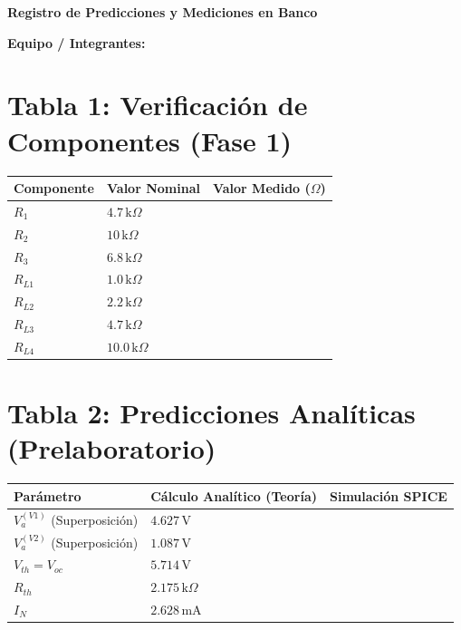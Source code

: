 \documentclass[11pt, a4paper]{article}
\begin{document}
\begin{tcolorbox}[colback=ucbblue!5!white, colframe=ucbblue, title=\textbf{Hoja de Registro de Datos: Experiencia Integrada A (Corregida)}]
    \centering \textbf{Registro de Predicciones y Mediciones en Banco}
\end{tcolorbox}

\vspace{0.2cm}
\textbf{Equipo / Integrantes:} \hrulefill

\section*{Tabla 1: Verificación de Componentes (Fase 1)}
\renewcommand{\arraystretch}{1.5}
\noindent
\begin{tabularx}{\textwidth}{|>{\RaggedRight}X|>{\RaggedRight}X|>{\RaggedRight}X|}
\hline
\rowcolor{ucbblue!10}\textbf{Componente} & \textbf{Valor Nominal} & \textbf{Valor Medido ($\Omega$)} \\
\hline
$R_1$ & $4.7\,\text{k}\Omega$ & \\ \hline
$R_2$ & $10\,\text{k}\Omega$ & \\ \hline
$R_3$ & $6.8\,\text{k}\Omega$ & \\ \hline
$R_{L1}$ & $1.0\,\text{k}\Omega$ & \\ \hline
$R_{L2}$ & $2.2\,\text{k}\Omega$ & \\ \hline
$R_{L3}$ & $4.7\,\text{k}\Omega$ & \\ \hline
$R_{L4}$ & $10.0\,\text{k}\Omega$ & \\ \hline
\end{tabularx}

\section*{Tabla 2: Predicciones Analíticas (Prelaboratorio)}
\noindent
\begin{tabularx}{\textwidth}{|>{\RaggedRight}X|>{\RaggedRight}X|>{\RaggedRight}X|}
\hline
\rowcolor{ucbblue!10}\textbf{Parámetro} & \textbf{Cálculo Analítico (Teoría)} & \textbf{Simulación SPICE} \\
\hline
$V_{a}^{(V1)}$ (Superposición) & $4.627\,\text{V}$ & \\ \hline
$V_{a}^{(V2)}$ (Superposición) & $1.087\,\text{V}$ & \\ \hline
$V_{th} = V_{oc}$ & $5.714\,\text{V}$ & \\ \hline
$R_{th}$ & $2.175\,\text{k}\Omega$ & \\ \hline
$I_{N}$ & $2.628\,\text{mA}$ & \\ \hline
\end{tabularx}
\end{document}

